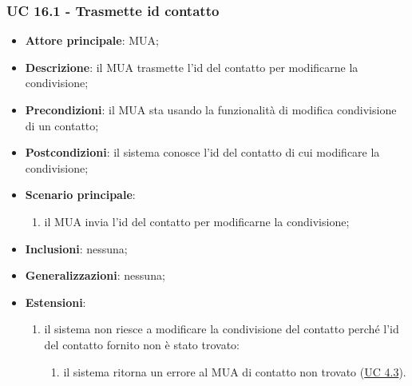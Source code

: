     \subsubsection{UC 16.1 - Trasmette id contatto} \label{sec:UC16.1}
    \begin{itemize}
        \item \textbf{Attore principale}: MUA;
        \item \textbf{Descrizione}: il MUA trasmette l'id del contatto per modificarne la condivisione;
        \item \textbf{Precondizioni}: il MUA sta usando la funzionalità di modifica condivisione di un contatto;
        \item \textbf{Postcondizioni}: il sistema conosce l'id del contatto di cui modificare la condivisione;
        \item \textbf{Scenario principale}:
            \begin{enumerate}
                \item il MUA invia l'id del contatto per modificarne la condivisione;
            \end{enumerate}
        \item \textbf{Inclusioni}: nessuna;
        \item \textbf{Generalizzazioni}: nessuna;
        \item \textbf{Estensioni}:
            \begin{enumerate}[label=\alph*.]
                \item il sistema non riesce a modificare la condivisione del contatto perché l'id del contatto fornito non è stato trovato:
                \begin{enumerate}[label=\arabic*.]
                    \item il sistema ritorna un errore al MUA di contatto non trovato (\hyperref[sec:UC4.3]{UC 4.3}).
                \end{enumerate}
            \end{enumerate}
    \end{itemize}


